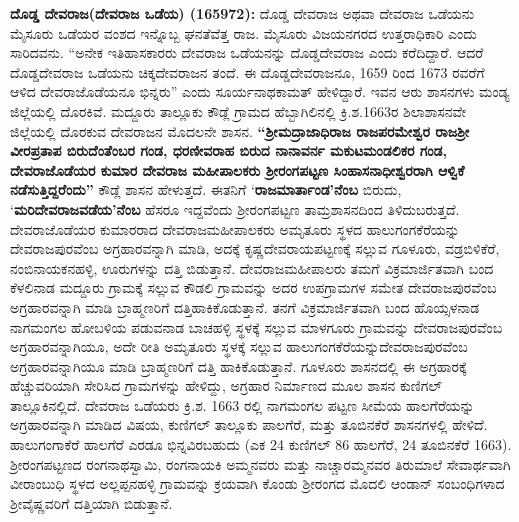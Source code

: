 \textbf{ದೊಡ್ಡ ದೇವರಾಜ(ದೇವರಾಜ ಒಡೆಯ) (165972):} ದೊಡ್ಡ ದೇವರಾಜ ಅಥವಾ ದೇವರಾಜ ಒಡೆಯನು ಮೈಸೂರು ಒಡೆಯರ ವಂಶದ ಇನ್ನೊಬ್ಬ ಘನತೆವೆತ್ತ ರಾಜ. ಮೈಸೂರು ವಿಜಯನಗರದ ಉತ್ತರಾಧಿಕಾರಿ ಎಂದು ಸಾರಿದವನು. “ಅನೇಕ ಇತಿಹಾಸಕಾರರು ದೇವರಾಜ ಒಡೆಯನನ್ನು ದೊಡ್ಡದೇವರಾಜ ಎಂದು ಕರೆದಿದ್ದಾರೆ. ಆದರೆ ದೊಡ್ಡದೇವರಾಜ ಒಡೆಯನು ಚಿಕ್ಕದೇವರಾಜನ ತಂದೆ. ಈ ದೊಡ್ಡದೇವರಾಜನೂ, 1659 ರಿಂದ 1673 ರವರೆಗೆ ಆಳಿದ ದೇವರಾಜೊಡೆಯನೂ ಭಿನ್ನರು” ಎಂದು ಸೂರ್ಯನಾಥಕಾಮತ್​ ಹೇಳಿದ್ದಾರೆ. ಇವನ ಆರು ಶಾಸನಗಳು ಮಂಡ್ಯ ಜಿಲ್ಲೆಯಲ್ಲಿ ದೊರಕಿವೆ. ಮದ್ದೂರು ತಾಲ್ಲೂಕು ಕೌಡ್ಲೆ ಗ್ರಾಮದ ಹೆಬ್ಬಾಗಿಲಿನಲ್ಲಿ ಕ್ರಿ.ಶ.1663ರ ಶಿಲಾಶಾಸನವೇ ಜಿಲ್ಲೆಯಲ್ಲಿ ದೊರಕುವ ದೇವರಾಜನ ಮೊದಲನೇ ಶಾಸನ. \textbf{“ಶ‍್ರೀಮದ್ರಾಜಾಧಿರಾಜ ರಾಜಪರಮೇಶ್ವರ ರಾಜಶ‍್ರೀ ವೀರಪ್ರತಾಪ ಬಿರುದೆಂತೆಂಬರ ಗಂಡ, ಧರಣೀವರಾಹ ಬಿರುದ ನಾನಾವರ್ನ ಮಕುಟಮಂಡಲಿಕರ ಗಂಡ, ದೇವರಾಜೊಡೆಯರ ಕುಮಾರ ದೇವರಾಜ ಮಹೀಪಾಲಕರು ಶ‍್ರೀರಂಗಪಟ್ಟಣ ಸಿಂಹಾಸನಾಧೀಶ್ವರರಾಗಿ ಆಳ್ವಿಕೆ ನಡೆಸುತ್ತಿದ್ದರೆಂದು”} ಕೌಡ್ಲೆ ಶಾಸನ ಹೇಳುತ್ತದೆ. ಈತನಿಗೆ ‘\textbf{ರಾಜಮಾರ್ತಾಂಡ’ನೆಂಬ} ಬಿರುದು, ‘\textbf{ಮರಿದೇವರಾಜವಡೆಯ’ನೆಂಬ} ಹೆಸರೂ ಇದ್ದವೆಂದು ಶ‍್ರೀರಂಗಪಟ್ಟಣ ತಾಮ್ರಶಾಸನದಿಂದ ತಿಳಿದುಬರುತ್ತದೆ. ದೇವರಾಜೊಡೆಯರ ಕುಮಾರರಾದ ದೇವರಾಜಮಹೀಪಾಲಕರು ಅಮೃತೂರು ಸ್ಥಳದ ಹಾಲುಗಂಗಕೆರೆಯನ್ನು ದೇವರಾಜಪುರವೆಂಬ ಅಗ್ರಹಾರವನ್ನಾಗಿ ಮಾಡಿ, ಅದಕ್ಕೆ ಕೃಷ್ಣದೇವರಾಯಪಟ್ಟಣಕ್ಕೆ ಸಲ್ಲುವ ಗೂಳೂರು, ವಡ್ರಬಿಳಿಕೆರೆ, ನಂಬಿನಾಯಕನಹಳ್ಳಿ, ಊರುಗಳನ್ನು ದತ್ತಿ ಬಿಡುತ್ತಾನೆ. ದೇವರಾಜಮಹೀಪಾಲರು ತಮಗೆ ವಿಕ್ರಮಾರ್ಜಿತವಾಗಿ ಬಂದ ಕೆಳಲಿನಾಡ ಮದ್ದೂರು ಗ್ರಾಮಕ್ಕೆ ಸಲ್ಲುವ ಕೌಡಲಿ ಗ್ರಾಮವನ್ನು ಅದರ ಉಪಗ್ರಾಮಗಳ ಸಮೇತ ದೇವರಾಜಪುರವೆಂಬ ಅಗ್ರಹಾರವನ್ನಾಗಿ ಮಾಡಿ ಬ್ರಾಹ್ಮಣರಿಗೆ ದತ್ತಿಹಾಕಿಕೊಡುತ್ತಾನೆ. ತನಗೆ ವಿಕ್ರಮಾರ್ಜಿತವಾಗಿ ಬಂದ ಹೊಯ್ಸಳನಾಡ ನಾಗಮಂಗಲ ಹೋಬಳಿಯ ಪಡುವನಾಡ ಬಾಚಹಳ್ಳಿ ಸ್ಥಳಕ್ಕೆ ಸಲ್ಲುವ ಮಾಳಗೂರು ಗ್ರಾಮವನ್ನು ದೇವರಾಜಪುರವೆಂಬ ಅಗ್ರಹಾರವನ್ನಾಗಿಯೂ, ಅದೇ ರೀತಿ ಅಮೃತೂರು ಸ್ಥಳಕ್ಕೆ ಸಲ್ಲುವ ಹಾಲುಗಂಗಕೆರೆಯನ್ನು\break ದೇವರಾಜಪುರವೆಂಬ ಅಗ್ರಹಾರವನ್ನಾಗಿಯೂ ಮಾಡಿ ಬ್ರಾಹ್ಮಣರಿಗೆ ದತ್ತಿ ಹಾಕಿಕೊಡುತ್ತಾನೆ. ಗೂಳೂರು ಶಾಸನದಲ್ಲಿ ಈ ಅಗ್ರಹಾರಕ್ಕೆ ಹೆಚ್ಚುವರಿಯಾಗಿ ಸೇರಿಸಿದ ಗ್ರಾಮಗಳನ್ನು ಹೇಳಿದ್ದು, ಅಗ್ರಹಾರ ನಿರ್ಮಾಣದ ಮೂಲ ಶಾಸನ ಕುಣಿಗಲ್​ ತಾಲ್ಲೂಕಿನಲ್ಲಿದೆ. ದೇವರಾಜ ಒಡೆಯರು ಕ್ರಿ.ಶ. 1663 ರಲ್ಲಿ ನಾಗಮಂಗಲ ಪಟ್ಟಣ ಸೀಮೆಯ ಹಾಲಗೆರೆಯನ್ನು ಅಗ್ರಹಾರವನ್ನಾಗಿ ಮಾಡಿದ ವಿಷಯ, ಕುಣಿಗಲ್ ತಾಲ್ಲೂಕು ಪಾಲಗೆರೆ, ಮತ್ತು ತೂಬಿನಕೆರೆ ಶಾಸನಗಳಲ್ಲಿ ಹೇಳಿದೆ. ಹಾಲುಗಂಗಾಕೆರೆ ಹಾಲಗೆರೆ ಎರಡೂ ಭಿನ್ನವಿರಬಹುದು (ಎಕ 24 ಕುಣಿಗಲ್ 86 ಹಾಲಗೆರೆ, 24 ತೂಬಿನಕೆರೆ 1663). ಶ‍್ರೀರಂಗಪಟ್ಟಣದ ರಂಗನಾಥಸ್ವಾಮಿ, ರಂಗನಾಯಕಿ ಅಮ್ಮನವರು ಮತ್ತು ನಾಚ್ಚಾರಮ್ಮನವರ ತಿರುಮಾಲೆ ಸೇವಾರ್ಥವಾಗಿ ವೀರಾಂಬುಧಿ ಸ್ಥಳದ ಅಲ್ಲಪ್ಪನಹಳ್ಳಿ ಗ್ರಾಮವನ್ನು ಕ್ರಯವಾಗಿ ಕೊಂಡು ಶ‍್ರೀರಂಗದ ಮೊದಲಿ ಆಂಡಾನ್​ ಸಂಬಂಧಿಗಳಾದ ಶ‍್ರೀವೈಷ್ಣವರಿಗೆ ದತ್ತಿಯಾಗಿ ಬಿಡುತ್ತಾನೆ.

